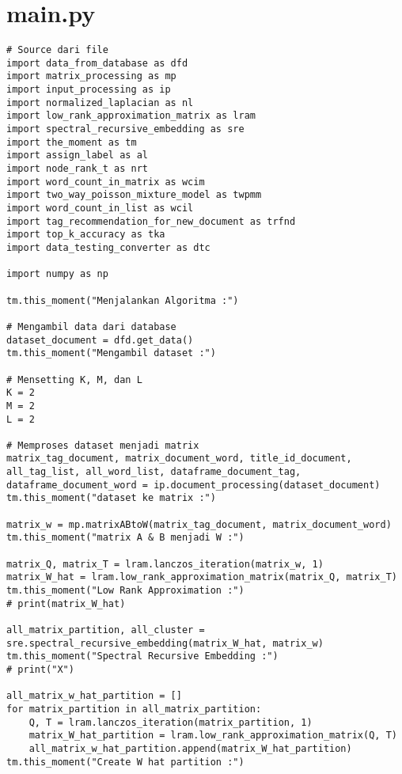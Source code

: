 \appendix 


\chapter{main.py}
\begin{lstlisting}[breaklines=true]
# Source dari file
import data_from_database as dfd 
import matrix_processing as mp
import input_processing as ip
import normalized_laplacian as nl
import low_rank_approximation_matrix as lram
import spectral_recursive_embedding as sre
import the_moment as tm
import assign_label as al
import node_rank_t as nrt
import word_count_in_matrix as wcim
import two_way_poisson_mixture_model as twpmm
import word_count_in_list as wcil
import tag_recommendation_for_new_document as trfnd
import top_k_accuracy as tka
import data_testing_converter as dtc

import numpy as np

tm.this_moment("Menjalankan Algoritma :")

# Mengambil data dari database
dataset_document = dfd.get_data()
tm.this_moment("Mengambil dataset :")

# Mensetting K, M, dan L
K = 2
M = 2
L = 2

# Memproses dataset menjadi matrix
matrix_tag_document, matrix_document_word, title_id_document, all_tag_list, all_word_list, dataframe_document_tag, dataframe_document_word = ip.document_processing(dataset_document)
tm.this_moment("dataset ke matrix :")

matrix_w = mp.matrixABtoW(matrix_tag_document, matrix_document_word)
tm.this_moment("matrix A & B menjadi W :")

matrix_Q, matrix_T = lram.lanczos_iteration(matrix_w, 1)
matrix_W_hat = lram.low_rank_approximation_matrix(matrix_Q, matrix_T)
tm.this_moment("Low Rank Approximation :") 
# print(matrix_W_hat)

all_matrix_partition, all_cluster = sre.spectral_recursive_embedding(matrix_W_hat, matrix_w)
tm.this_moment("Spectral Recursive Embedding :")
# print("X")

all_matrix_w_hat_partition = []
for matrix_partition in all_matrix_partition:
	Q, T = lram.lanczos_iteration(matrix_partition, 1)
	matrix_W_hat_partition = lram.low_rank_approximation_matrix(Q, T)
	all_matrix_w_hat_partition.append(matrix_W_hat_partition)
tm.this_moment("Create W hat partition :")


\end{lstlisting}

